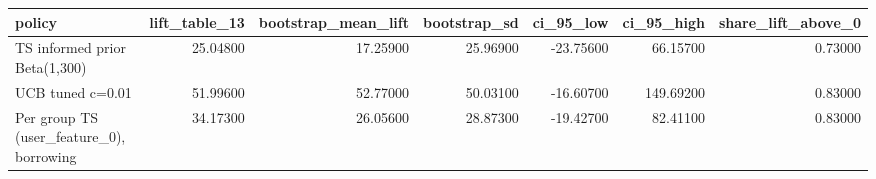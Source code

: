 \begin{tabular}{lrrrrrr}
\toprule
policy & lift\_table\_13 & bootstrap\_mean\_lift & bootstrap\_sd & ci\_95\_low & ci\_95\_high & share\_lift\_above\_0 \\
\midrule
TS informed prior Beta(1,300) & 25.04800 & 17.25900 & 25.96900 & -23.75600 & 66.15700 & 0.73000 \\
UCB tuned c=0.01 & 51.99600 & 52.77000 & 50.03100 & -16.60700 & 149.69200 & 0.83000 \\
Per group TS (user\_feature\_0), borrowing & 34.17300 & 26.05600 & 28.87300 & -19.42700 & 82.41100 & 0.83000 \\
\bottomrule
\end{tabular}
